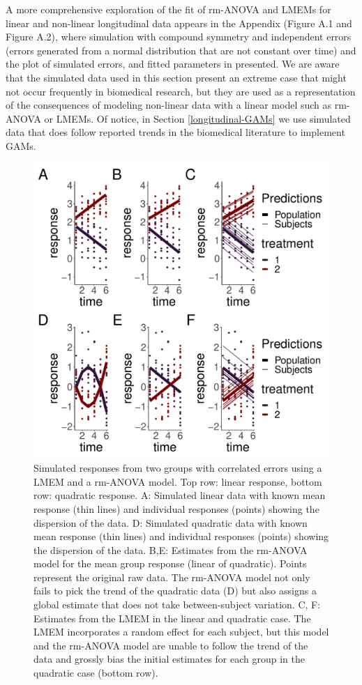 \documentclass[Royal,times,doublespace,sagev]{sagej}
\begin{document}
A more comprehensive exploration of the fit of rm-ANOVA and LMEMs for linear and non-linear longitudinal data appears in the Appendix (Figure A.1 and Figure A.2), where simulation with compound symmetry and independent errors (errors generated from a normal distribution that are not constant over time) and the plot of simulated errors, and fitted parameters in presented. We are aware that the simulated data used in this section present an extreme case that might not occur frequently in biomedical research, but they are used as a representation of the consequences of modeling non-linear data with a linear model such as rm-ANOVA or LMEMs. Of notice, in Section \ref{longitudinal-GAMs} we use simulated data that does follow reported trends in the biomedical literature to implement GAMs.



\begin{figure}

{\centering \includegraphics[width=0.75\linewidth]{Full_document_SAGE_No_Appendix_files/figure-latex/l-q-response-1}

}

\caption{Simulated responses from two groups with correlated errors using a LMEM and a rm-ANOVA model. Top row: linear response, bottom row: quadratic response. A: Simulated linear data with known mean response (thin lines) and individual responses (points) showing the dispersion of the data. D: Simulated quadratic data with known mean response (thin lines) and individual responses (points) showing the dispersion of the data. B,E: Estimates from the rm-ANOVA model for the mean group response (linear of quadratic). Points represent the original raw data. The rm-ANOVA model not only fails to pick the trend of the quadratic data (D) but also assigns a global estimate that does not take between-subject variation. C, F: Estimates from the LMEM in the linear and quadratic case. The LMEM incorporates a random effect for each subject, but this model and the rm-ANOVA model are unable to follow the trend of the data and grossly bias the initial estimates for each group in the quadratic case (bottom row).}\label{fig:l-q-response}
\end{figure}
\end{document}
